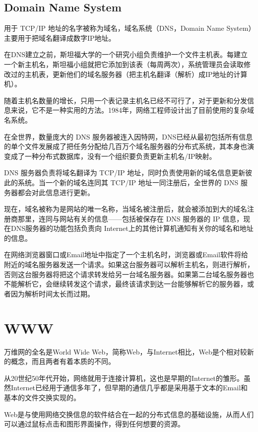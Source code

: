 \section{Domain Name System}

用于 TCP/IP 地址的名字被称为域名，域名系统（DNS，Domain Name System）主要用于把域名翻译成数字IP地址。

在DNS建立之前，斯坦福大学的一个研究小组负责维护一个文件主机表。每建立一个新主机名，斯坦福小组就把它添加到该表（每周两次），系统管理员会读取修改过的主机表，更新他们的域名服务器（把主机名翻译（解析）成IP地址的计算机）。

随着主机名数量的增长，只用一个表记录主机名已经不可行了，对于更新和分发信息来说，它不是一种实用的方法。1984年，网络工程师设计出了目前使用的复杂域名系统。


在全世界，数量庞大的 DNS 服务器被连入因特网，DNS已经从最初包括所有信息的单个文件发展成了把任务分配给几百万个域名服务器的分布式系统，其本身也演变成了一种分布式数据库，没有一个组织要负责更新主机名/IP映射。

DNS 服务器负责将域名翻译为 TCP/IP 地址，同时负责使用新的域名信息更新彼此的系统。当一个新的域名连同其 TCP/IP 地址一同注册后，全世界的 DNS 服务器都会对此信息进行更新。

现在，域名被称为是网站的唯一名称，当域名被注册后，就会被添加到大的域名注册商那里，连同与网站有关的信息——包括被保存在 DNS 服务器的 IP 信息，现在DNS服务器的功能包括负责向 Internet上的其他计算机通知有关你的域名和地址的信息。


在网络浏览器窗口或Email地址中指定了一个主机名时，浏览器或Email软件将给附近的域名服务器发送一个请求。如果这台服务器可以解析主机名，则进行解析，否则这台服务器将把这个请求转发给另一台域名服务器。如果第二台域名服务器也不能解析它，会继续转发这个请求，最终该请求到达一台能够解析它的服务器，或者因为解析时间太长而过期。



\chapter{WWW}

万维网的全名是World Wide Web，简称Web，与Internet相比，Web是个相对较新的概念，而且两者有着本质的不同。




从20世纪50年代开始，网络就用于连接计算机，这也是早期的Internet的雏形。虽然Internet已经用于通信多年了，但早期的通信几乎都是采用基于文本的Email和基本的文件交换实现的。



Web是与使用网络交换信息的软件结合在一起的分布式信息的基础设施，从而人们可以通过鼠标点击和图形界面操作，得到任何想要的资源。




